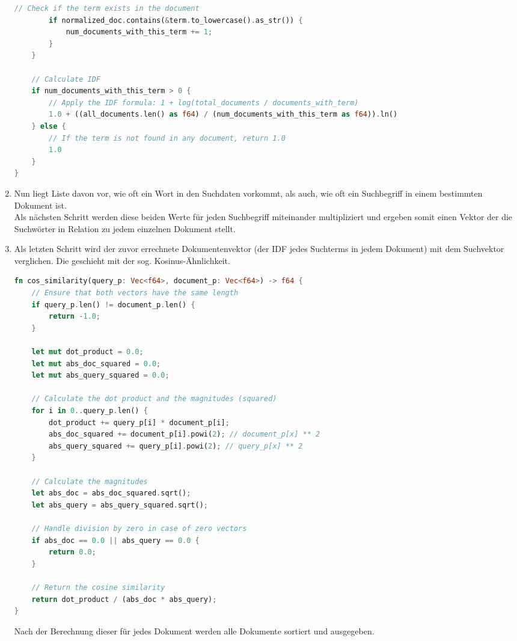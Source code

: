 \begin{enumerate}
\begin{lstlisting}[language=Rust]
        // Check if the term exists in the document
        if normalized_doc.contains(&term.to_lowercase().as_str()) {
            num_documents_with_this_term += 1;
        }
    }

    // Calculate IDF
    if num_documents_with_this_term > 0 {
        // Apply the IDF formula: 1 + log(total_documents / documents_with_term)
        1.0 + ((all_documents.len() as f64) / (num_documents_with_this_term as f64)).ln()
    } else {
        // If the term is not found in any document, return 1.0
        1.0
    }
}
\end{lstlisting}

    \item Nun liegt Liste davon vor, wie oft ein Wort in den Suchdaten vorkommt, als auch, wie oft ein Suchbegriff in einem bestimmten Dokument ist. \\ Als nächsten Schritt werden diese beiden Werte für jeden Suchbegriff miteinander multipliziert und ergeben somit einen Vektor der die Suchwörter in Relation zu jedem einzelnen Dokument stellt.
    \item Als letzten Schritt wird der zuvor errechnete Dokumentenvektor (der IDF jedes Suchterms in jedem Dokument) mit dem Suchvektor verglichen. Die geschieht mit der sog. Kosinus-Ähnlichkeit.
    \begin{lstlisting}[language=Rust]
fn cos_similarity(query_p: Vec<f64>, document_p: Vec<f64>) -> f64 {
    // Ensure that both vectors have the same length
    if query_p.len() != document_p.len() {
        return -1.0;
    }

    let mut dot_product = 0.0;
    let mut abs_doc_squared = 0.0;
    let mut abs_query_squared = 0.0;

    // Calculate the dot product and the magnitudes (squared)
    for i in 0..query_p.len() {
        dot_product += query_p[i] * document_p[i];
        abs_doc_squared += document_p[i].powi(2); // document_p[x] ** 2
        abs_query_squared += query_p[i].powi(2); // query_p[x] ** 2
    }

    // Calculate the magnitudes
    let abs_doc = abs_doc_squared.sqrt();
    let abs_query = abs_query_squared.sqrt();

    // Handle division by zero in case of zero vectors
    if abs_doc == 0.0 || abs_query == 0.0 {
        return 0.0;
    }

    // Return the cosine similarity
    return dot_product / (abs_doc * abs_query);
}\end{lstlisting}
    Nach der Berechnung dieser für jedes Dokument werden alle Dokumente sortiert und ausgegeben.
\end{enumerate}






